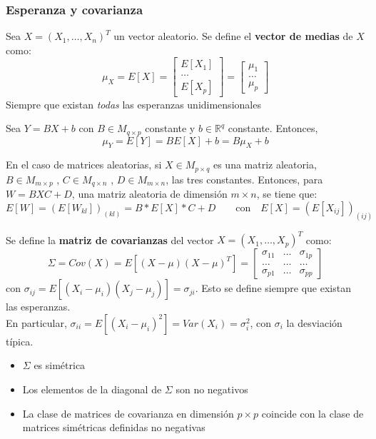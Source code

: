 \subsubsection{Esperanza y covarianza}
\begin{ndef}
  Sea $X=(X_1,\dots,X_n)^T$ un vector aleatorio. Se define el \textbf{vector de medias} de $X$ como:
  \[
  \mu_X = E[X] = \begin{bmatrix}  E[X_1] \\ \dots \\ E[X_p] \end{bmatrix} = \begin{bmatrix} \mu_1 \\ \dots \\ \mu_p \end{bmatrix}
  \]
  Siempre que existan \emph{todas} las esperanzas unidimensionales
  \end{ndef}

\begin{nprop}
  Sea $Y = BX + b$ con $B \in M_{q\times p}$ constante y $b \in \mathbb R^q$ constante. Entonces,
  \[
\mu_Y = E[Y] = BE[X] + b = B\mu_X + b
\]
\end{nprop}

En el caso de matrices aleatorias, si $X\in M_{p\times q}$ es una matriz aleatoria, $B\in M_{m\times p}$ , $C \in M_{q\times n}$ , $D \in M_{m \times n}$, las tres constantes. Entonces, para $W = BXC + D$, una matriz aleatoria de dimensión $m\times n$, se tiene que:
\[
E[W] = (E[W_{kl}])_{(kl)} = B * E[X] * C + D \quad \quad \text{con} \quad E[X] = (E[X_{ij}])_{(ij)}
\]

\begin{ndef}
  Se define la \textbf{matriz de covarianzas} del vector $X = (X_1,\dots,X_p)^T$ como:
  \[
\Sigma = Cov(X) = E[(X-\mu)(X-\mu)^T] = \begin{bmatrix} \sigma_{11} & \dots & \sigma_{1p} \\ \dots& \dots & \dots \\ \sigma_{p1} &  \dots & \sigma_{pp}\end{bmatrix}
\]
con $\sigma_{ij} = E[(X_i - \mu_i)(X_j - \mu_j)] = \sigma_{ji}$. Esto se define siempre que existan las esperanzas.\\
En particular, $\sigma_{ii}=E[(X_i - \mu_i)^2] = Var(X_i) = \sigma_i^2$, con $\sigma_i$ la desviación típica.
\end{ndef}

\begin{nprop}
  \begin{itemize}
  \item $\Sigma$ es simétrica
  \item Los elementos de la diagonal de $\Sigma$ son no negativos
    \item La clase de matrices de covarianza en dimensión $p\times p$ coincide con la clase de matrices simétricas definidas no negativas
    \end{itemize}
  \end{nprop}


